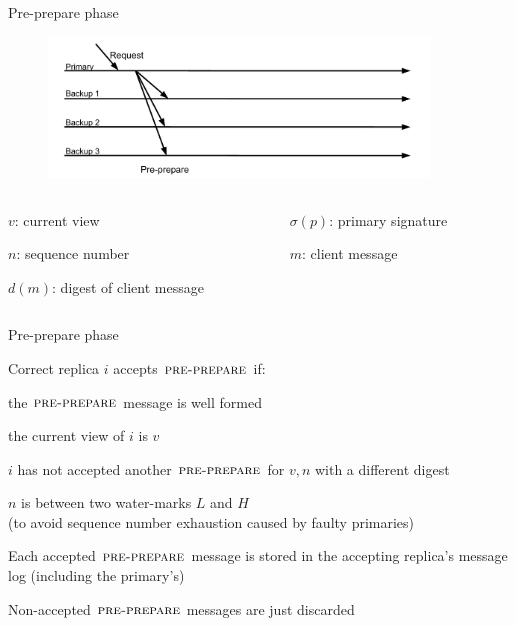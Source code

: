 \begin{frame}{Pre-prepare phase}

\begin{figure}
\includegraphics[width=0.9\textwidth, trim=0 20 0 60]{figs/16/messages1}
\end{figure}
\begin{columns}
	\begin{column}{0.5\textwidth}
	\BI
	\item $v$: current view
	\item $n$: sequence number
	\item $d(m)$: digest of client message
	\EI
	\end{column}
	\begin{column}{0.5\textwidth}
	\BI
	\item $\sigma(p)$: primary signature
	\item $m$: client message
	\EI
	\end{column}
\end{columns}



\end{frame}


\begin{frame}{Pre-prepare phase}

\BIL
\item  Correct replica $i$ accepts $\textsc{pre-prepare}$ if:
\BI
	\item the $\textsc{pre-prepare}$ message is well formed
	\item the current view of $i$ is $v$
	\item $i$ has not accepted another $\textsc{pre-prepare}$ for $v, n$ with a different digest
	\item $n$ is between two water-marks $L$ and $H$\\
			(to avoid sequence number exhaustion caused by faulty primaries)
	\EI
\item Each accepted $\textsc{pre-prepare}$ message is stored in the
accepting replica's message log (including the primary's)
\item Non-accepted $\textsc{pre-prepare}$ messages are just discarded
\EIL

\end{frame}

